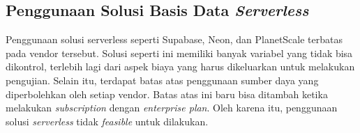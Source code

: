 \subsection{Penggunaan Solusi Basis Data \textit{Serverless}}

Penggunaan solusi serverless seperti Supabase, Neon, dan PlanetScale terbatas pada vendor tersebut. Solusi seperti ini memiliki banyak variabel yang tidak bisa dikontrol, terlebih lagi dari aspek biaya yang harus dikeluarkan untuk melakukan pengujian. Selain itu, terdapat batas atas penggunaan sumber daya yang diperbolehkan oleh setiap vendor. Batas atas ini baru bisa ditambah ketika melakukan \textit{subscription} dengan \textit{enterprise plan}. Oleh karena itu, penggunaan solusi \textit{serverless} tidak \textit{feasible} untuk dilakukan.